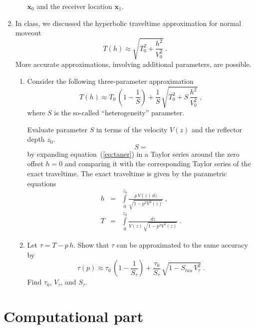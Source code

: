 \begin{enumerate}
\begin{enumerate}
    $\mathbf{x}_0$ and the receiver location $\mathbf{x}_1$.
  \end{enumerate}
\item In class, we discussed the hyperbolic traveltime approximation for normal moveout
  \begin{equation}
  \label{eq:hyper2}
  T(h) \approx \sqrt{T_0^2 + \frac{h^2}{V_0^2}}\;.
\end{equation}
More accurate approximations, involving additional parameters, are possible.
\begin{enumerate}
\item Consider the following three-parameter approximation
  \begin{equation}
    \label{eq:taner}
    T(h) \approx T_0\,\left(1-\frac{1}{S}\right) + 
\frac{1}{S}\,\sqrt{T_0^2+S\,\frac{h^2}{V_0^2}}\;,
  \end{equation}
  where $S$ is the so-called ``heterogeneity'' parameter. 

Evaluate parameter $S$ in terms of the velocity $V(z)$ and the reflector depth $z_0$.
\begin{equation}
  \label{eq:a}
  S =
\end{equation}
by expanding
  equation~(\ref{eq:taner}) in a Taylor series around the zero offset
  $h=0$ and comparing it with the corresponding Taylor series of the exact
  traveltime. The exact traveltime is given by the parametric equations
  \begin{eqnarray}
\label{eq:xofp}
h & = & \int\limits_0^{z_0} \frac{p\,V(z)\,dz}{\sqrt{1-p^2 V^2(z)}}\;, \\
\label{eq:tofp}
T & = & \int\limits_0^{z_0} \frac{dz}{V(z)\,\sqrt{1-p^2 V^2(z)}}\;.
\end{eqnarray}
\item Let $\tau = T-p\,h$. Show that $\tau$ can be approximated to the same accuracy by
\begin{equation}
    \label{eq:taner}
    \tau(p) \approx \tau_0\,\left(1-\frac{1}{S_{\tau}}\right) + 
\frac{\tau_0}{S_{\tau}}\,\sqrt{1-S_{tau}\,{V_{\tau}^2}}\;.
  \end{equation}
Find $\tau_0$, $V_{\tau}$, and $S_{\tau}$.
\end{enumerate}
\end{enumerate}

\lstset{language=python,numbers=left,numberstyle=\tiny,showstringspaces=false}

\newpage


\section{Computational part}


